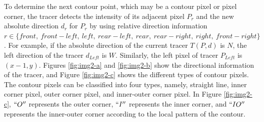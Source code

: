 
To determine the next contour point, which may be a contour pixel or pixel corner, the tracer detects the intensity of its adjacent pixel $P_r$ and the new absolute direction $d_r$ for $P_r$ by using relative direction information $r\in\{front,\ front-left,\ left,\ rear-left,\ rear,\ rear-right,\ right,\ front-right\}$. For example, if the absolute direction of the current tracer $T(P, d)$ is $N$, the left direction of the tracer $d_{Left}$ is $W$. Similarly, the left pixel of tracer $P_{Left}$ is $(x - 1, y)$. Figures \ref{fig:img2-a} and \ref{fig:img2-b} show the directional information of the tracer, and Figure \ref{fig:img2-c} shows the different types of contour pixels. The contour pixels can be classified into four types, namely, straight line, inner corner pixel, outer corner pixel, and inner-outer corner pixel. In Figure \ref{fig:img2-c}, $``O''$ represents the outer corner, $``I''$ represents the inner corner, and $``IO''$ represents the inner-outer corner according to the local pattern of the contour.


